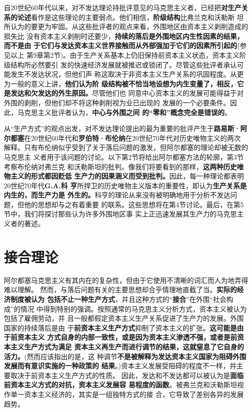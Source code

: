 自20世纪60年代以来，对不发达理论持批评意见的马克思主义者，已经把\textbf{对生产关
  系的论述}看作是这些理论的主要弱点。他们相信，\textbf{阶级结构}比弗兰克和沃勒斯
坦所认为的要更为牢固。从这些批评者的观点来看，外围地区由资本主义剥削造成的损失比
没有资本主义剥削时还要少，\textbf{持续的落后是外围地区内生性因素的结果，而不是由
  于它们与发达资本主义世界接触而从外部强加于它们的因素所引起的}(参见以上
第9章第2节)。由于生产关系基本上仍旧保持前资本主义状态，资本主义阶级结构所必然要引
发的快速经济发展就被推迟或锁闭了。尽管这些批评者承认可能发生不发达状况，但他们声
称这取决于非资本主义生产关系的巩固程度。从更为一般的意义上讲，\textbf{他们认为阶
  级结构被不恰当地设想为内生变量了，相反，它是发达和欠发达的外生原因。}尽管他们也
同意中心资本主义的发展可能得益于对外围的剥削，但他们却不将这种剥削视为业已出现的
发展的一个必要条件。因此，马克思主义批评者认为，\textbf{中心与外围之间
  的“零和”概念完全是错误的}。

从“生产方式”的观点出发，对不发达理论提出的最为重要的批评产生于\textbf{路易斯·阿
  尔都塞}在20世纪60年代和\textbf{罗伯特·布伦纳}在20世纪70年代对历史唯物主义的两次
解释。只有布伦纳似乎受到了关于落后问题的激发，但阿尔都塞的理论却被无数的马克思主
义者用于该问题的讨论。以下第2节将给出阿尔都塞方法的轮廓，第3节考察布伦纳对弗兰克
和沃勒斯坦的批判。像我们将要看到的那样，\textbf{这两种历史唯物主义的形式都因贬低
  生产力的因果涵义而受到批判。}因此，每一种理论都表明20世纪70年代\textbf{G.A.科
  亨}所捍卫的历史唯物主义版本的重要性，即认为\textbf{生产关系是内生的，而生产力是
  外生的。}科亨的理论从来没有被明确地用于分析不发达问题，但他的思想却与之有着重要
的联系。这些思想将在第4节讨论。最后，在第5节中，我们将探讨那些认为许多外围地区事
实上正迅速发展其生产力的马克思主义者的著述。

\section{接合理论}

阿尔都塞马克思主义有其内在的复杂性，但由于它使用不清晰的词汇而人为地弄得难以理解。
然而，与落后问题有关的主要思想却合乎情理地直截了当。\textbf{实际的经济制度被认为
  包括不止一种生产方式}，并且这种方式的“\textbf{接合}”在外围“社会构成”的情况
中得到特别的强调。按照通常的马克思主义分析方式，资本主义被认为包括了雇佣劳动，并
且一般都假定资本主义生产关系促进了生产力的发展。外围国家的持续落后是由
于\textbf{前资本主义生产方式}抑制了资本主义的扩张。\textbf{这可能是由于前资本主义
  方式自身的内部一致性，或是因为资本主义渗透不强，或者是前资本主义生产方式为满足
  资本主义再生产而进行调节的结果，这就窒息了它自身的活力。}(然而应该指出的是，这
种调节\textbf{不是被解释为发达资本主义国家为阻碍外围发展而有意识实施的一种政策的
  结果}。)资本主义发展受阻碍的程度不一样，并主要取决于前资本主义生产方式的性质。
因此，发达和不发达都可以被认为是\textbf{面临前资本主义方式的对抗，资本主义发展容
  易程度的函数}。被弗兰克和沃勒斯坦视作单一资本主义经济的，其实是一组独特方式的接
合，它导致了差别各异的发展趋势。

